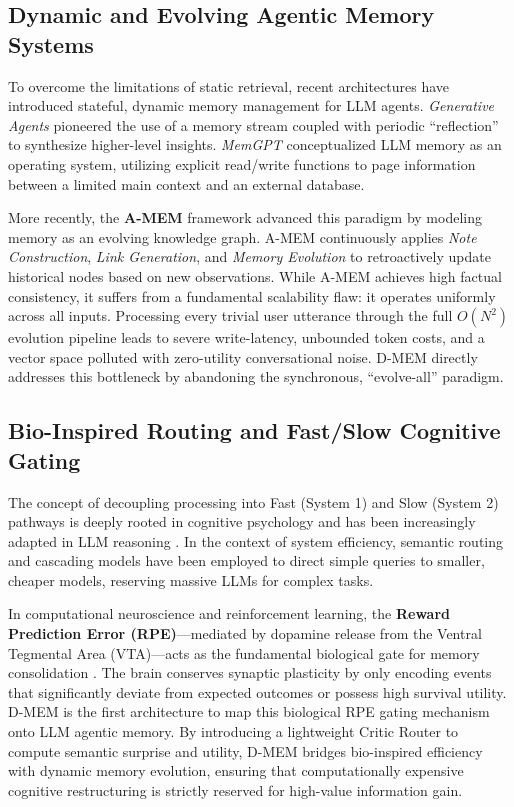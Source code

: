 \documentclass{article}
\begin{document}
\subsection{Dynamic and Evolving Agentic Memory Systems}
To overcome the limitations of static retrieval, recent architectures have introduced stateful, dynamic memory management for LLM agents. \textit{Generative Agents} \citep{park2023generative} pioneered the use of a memory stream coupled with periodic ``reflection'' to synthesize higher-level insights. \textit{MemGPT} \citep{packer2024memgpt} conceptualized LLM memory as an operating system, utilizing explicit read/write functions to page information between a limited main context and an external database. 

More recently, the \textbf{A-MEM} framework \citep{amem2025} advanced this paradigm by modeling memory as an evolving knowledge graph. A-MEM continuously applies \textit{Note Construction}, \textit{Link Generation}, and \textit{Memory Evolution} to retroactively update historical nodes based on new observations. While A-MEM achieves high factual consistency, it suffers from a fundamental scalability flaw: it operates uniformly across all inputs. Processing every trivial user utterance through the full $O(N^2)$ evolution pipeline leads to severe write-latency, unbounded token costs, and a vector space polluted with zero-utility conversational noise. D-MEM directly addresses this bottleneck by abandoning the synchronous, ``evolve-all'' paradigm.

\subsection{Bio-Inspired Routing and Fast/Slow Cognitive Gating}
The concept of decoupling processing into Fast (System 1) and Slow (System 2) pathways is deeply rooted in cognitive psychology \citep{kahneman2011thinking} and has been increasingly adapted in LLM reasoning \citep{yao2023tree}. In the context of system efficiency, semantic routing and cascading models \citep{chen2023frugalgpt} have been employed to direct simple queries to smaller, cheaper models, reserving massive LLMs for complex tasks.

In computational neuroscience and reinforcement learning, the \textbf{Reward Prediction Error (RPE)}---mediated by dopamine release from the Ventral Tegmental Area (VTA)---acts as the fundamental biological gate for memory consolidation \citep{schultz1997neural}. The brain conserves synaptic plasticity by only encoding events that significantly deviate from expected outcomes or possess high survival utility. D-MEM is the first architecture to map this biological RPE gating mechanism onto LLM agentic memory. By introducing a lightweight Critic Router to compute semantic surprise and utility, D-MEM bridges bio-inspired efficiency with dynamic memory evolution, ensuring that computationally expensive cognitive restructuring is strictly reserved for high-value information gain.
\end{document}
